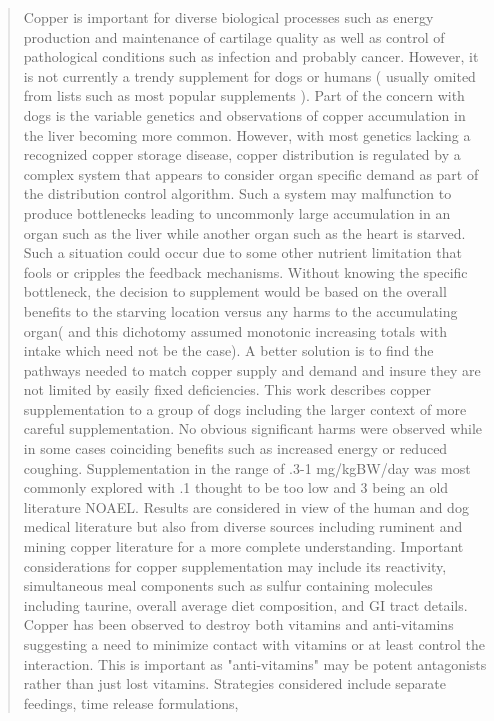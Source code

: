 \begin{abstract}
Copper is  important for diverse biological processes
such as energy production
and maintenance of cartilage quality as well as control of pathological
conditions such as infection and probably cancer. 
However, it  is not currently a trendy supplement for dogs or
humans ( usually omited from lists such as
most popular supplements \cite{Network_Supplements_} ). Part of the concern with dogs is the variable
genetics and observations of copper accumulation in the liver
becoming more common. However, with most genetics lacking
a recognized  copper storage disease, copper distribution is
regulated by a complex system that appears to consider
organ specific  demand as part of the distribution control 
algorithm.  Such a system may malfunction to produce bottlenecks leading to
uncommonly large accumulation in an organ such as the liver
while another organ such as the heart is starved.
Such a situation could occur due to some other nutrient
limitation that fools or cripples  the feedback mechanisms.
Without knowing the specific bottleneck, the decision
to supplement would be based on the overall benefits
to the starving location versus any harms to the 
accumulating organ( and this dichotomy assumed monotonic increasing totals with intake which need not be the case).  
A better solution is to find the 
pathways needed to match copper supply and demand 
and insure they are not limited by easily fixed deficiencies.
This work describes copper supplementation to a group
of dogs including the larger context of more careful supplementation.
No obvious significant harms were observed  while 
in some cases coinciding benefits such as
increased energy or reduced coughing.  
Supplementation in the range of .3-1 mg/kgBW/day was most
commonly explored  with .1 thought to be too low and  3
being an old literature NOAEL. 
Results are considered in view of the human and dog medical literature but
also from diverse sources including
ruminent  and mining copper literature for a more complete understanding. 
Important considerations for copper supplementation
may include its reactivity, simultaneous meal components
such as sulfur containing molecules including taurine, overall average diet
composition, and
GI tract details. Copper has been observed to destroy both
vitamins and anti-vitamins suggesting a need to minimize contact with
vitamins or at least control the interaction.
This is important as "anti-vitamins" may be potent antagonists
rather than just lost vitamins. 
Strategies considered include separate feedings, time release formulations, 

\end{abstract}
